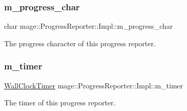 \subsubsection{\texorpdfstring{m\+\_\+progress\+\_\+char}{m\_progress\_char}}
{\footnotesize\ttfamily char mage\+::\+Progress\+Reporter\+::\+Impl\+::m\+\_\+progress\+\_\+char\hspace{0.3cm}{\ttfamily [private]}}

The progress character of this progress reporter. \hypertarget{classmage_1_1_progress_reporter_1_1_impl_a8eea94dc2c87abc34d80ad61b5adea2e}{}\label{classmage_1_1_progress_reporter_1_1_impl_a8eea94dc2c87abc34d80ad61b5adea2e} 
\subsubsection{\texorpdfstring{m\+\_\+timer}{m\_timer}}
{\footnotesize\ttfamily \hyperlink{namespacemage_a06f4035ef59f07892e594bf1178a108a}{Wall\+Clock\+Timer} mage\+::\+Progress\+Reporter\+::\+Impl\+::m\+\_\+timer\hspace{0.3cm}{\ttfamily [private]}}

The timer of this progress reporter. 